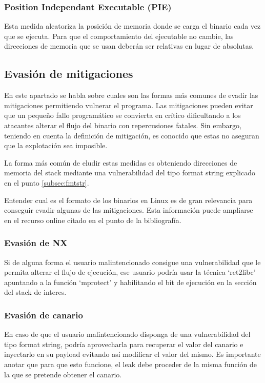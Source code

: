 \subsubsection{Position Independant Executable (PIE)}
Esta medida aleatoriza la posición de memoria donde se carga el binario cada vez que se ejecuta.
Para que el comportamiento del ejecutable no cambie, las direcciones de memoria que se usan deberán ser relativas en lugar de absolutas.
\subsection{Evasión de mitigaciones}
En este apartado se habla sobre cuales son las formas más comunes de evadir las mitigaciones permitiendo vulnerar el programa.
Las mitigaciones pueden evitar que un pequeño fallo programático se convierta en crítico dificultando a los atacantes alterar el flujo del binario con repercusiones fatales.
Sin embargo, teniendo en cuenta la definición de mitigación, es conocido que estas no aseguran que la explotación sea imposible.

La forma más común de eludir estas medidas es obteniendo direcciones de memoria del stack mediante una vulnerabilidad del tipo format string explicado en el punto \ref{subsec:fmtstr}.

Entender cual es el formato de los binarios en Linux es de gran relevancia para conseguir evadir algunas de las mitigaciones.
Esta información puede ampliarse en el recurso online citado en el punto \cite{x64asm} de la bibliografía.

\subsubsection{Evasión de NX}
Si de alguna forma el usuario malintencionado consigue una vulnerabilidad que le permita alterar el flujo de ejecución, ese usuario podría usar la técnica `ret2libc' apuntando a la función `mprotect' y habilitando el bit de ejecución en la sección del stack de interes.

\subsubsection{Evasión de canario}
En caso de que el usuario malintencionado disponga de una vulnerabilidad del tipo format string, podría aprovecharla para recuperar el valor del canario e inyectarlo en su payload evitando así modificar el valor del mismo.
Es importante anotar que para que esto funcione, el leak debe proceder de la misma función de la que se pretende obtener el canario.

